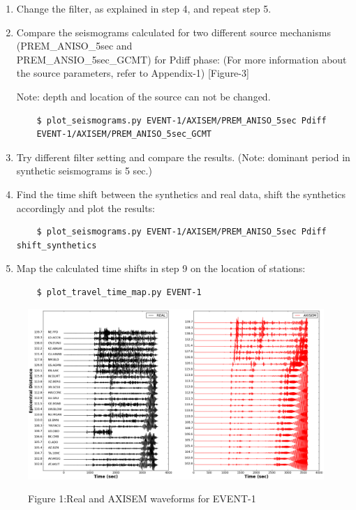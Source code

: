 \documentclass{article}
\begin{document}
\begin{enumerate}
    \item Change the filter, as explained in step 4, and repeat step 5.
    
    \item Compare the seismograms calculated for two different source mechanisms
    (PREM\_ANISO\_5sec and \\ PREM\_ANSIO\_5sec\_GCMT) for Pdiff phase: (For more 
    information about the source parameters, refer to Appendix-1) [Figure-3] 
    
    Note: depth and location of the source can not be changed.
    \begin{verbatim}
    $ plot_seismograms.py EVENT-1/AXISEM/PREM_ANISO_5sec Pdiff 
    EVENT-1/AXISEM/PREM_ANISO_5sec_GCMT
    \end{verbatim}
    
    \item Try different filter setting and compare the results.
    (Note: dominant period in synthetic seismograms is 5 sec.)
    
    \item Find the time shift between the synthetics and real data, shift the synthetics
    accordingly and plot the results:
    
    \begin{verbatim}
    $ plot_seismograms.py EVENT-1/AXISEM/PREM_ANISO_5sec Pdiff shift_synthetics
    \end{verbatim}
    
    \item Map the calculated time shifts in step 9 on the location of stations:
    
    \begin{verbatim}
    $ plot_travel_time_map.py EVENT-1
    \end{verbatim}

\end{enumerate}

\newpage
\begin{figure}[H]
\centering
\includegraphics[width=1.\linewidth]{AXISEMTutorial-fig007.png}
\begin{center}
{\small{}Figure 1:Real and AXISEM waveforms for EVENT-1}
\end{center}
\end{figure}
\end{document}
